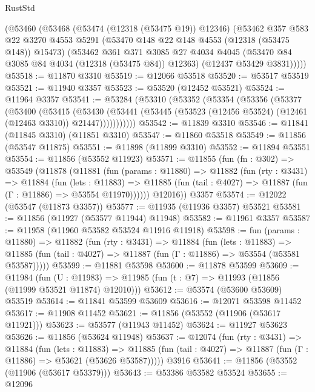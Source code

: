 \begin{lexlean}{RustStd}
\begin{coremodule}
    (@53460
      (@53468
        (@53474 (@12318 (@53475 @19)) @12346)
        (@53462
          @357
          @583
          @22
          @3270
          @4553
          @5291
          (@53470 @148 @22 @148 @4553 (@12318 (@53475 @148)) @15473)
          (@53462
            @361
            @371
            @3085
            @27
            @4034
            @4045
            (@53470 @84 @3085 @84 @4034 (@12318 (@53475 @84)) @12363)
            (@12437 @53429 @3831)))))
@53518 := @11870 @3310
@53519 := @12066 @53518
@53520 := @53517 @53519
@53521 := @11940 @3357
@53523 := @53520 (@12452 @53521)
@53524 := @11964 @3357
@53541 := @53284
    (@53310
      (@53352
        (@53354
          (@53356
            (@53377
              (@53400
                (@53415
                  (@53430
                    (@53441
                      (@53445 (@53523 (@12456 @53524) (@12461 (@12463 @3310)) @21447)))))))))))
@53542 := @11839 @3310
@53546 := @11841 (@11845 @3310) (@11851 @3310)
@53547 := @11860 @53518
@53549 := @11856 (@53547 @11875)
@53551 := @11898 (@11899 @3310)
@53552 := @11894 @53551
@53554 := @11856 (@53552 @11923)
@53571 := @11855
    (fun (fn : @302) =>
    @53549
      (@11878
        (@11881
          (fun (params : @11880) =>
          @11882
            (fun (rty : @3431) =>
            @11884
              (fun (lets : @11883) =>
              @11885 (fun (tail : @4027) => @11887 (fun (Γ : @11886) => @53554 @11970))))))
        @12016))
    @3357
@53574 := @12022 (@53547 (@11873 @3357))
@53577 := @11935 (@11936 @3357) @53521
@53581 := @11856 (@11927 (@53577 @11944) @11948)
@53582 := @11961 @3357
@53587 := @11958 (@11960 @53582 @53524 @11916 @11918)
@53598 := fun (params : @11880) =>
  @11882
    (fun (rty : @3431) =>
    @11884
      (fun (lets : @11883) =>
      @11885 (fun (tail : @4027) => @11887 (fun (Γ : @11886) => @53554 (@53581 @53587)))))
@53599 := @11881 @53598
@53600 := @11878 @53599
@53609 := @11984
    (fun (U : @11983) => @11985 (fun (t : @7) => @11993 (@11856 (@11999 @53521 @11874) @12010)))
@53612 := @53574 (@53600 @53609) @53519
@53614 := @11841 @53599 @53609
@53616 := @12071 @53598 @11452
@53617 := @11908 @11452
@53621 := @11856 (@53552 (@11906 (@53617 @11921)))
@53623 := @53577 (@11943 @11452)
@53624 := @11927 @53623
@53626 := @11856 (@53624 @11948)
@53637 := @12074
    (fun (rty : @3431) =>
    @11884
      (fun (lets : @11883) =>
      @11885 (fun (tail : @4027) => @11887 (fun (Γ : @11886) => @53621 (@53626 @53587)))))
    @3916
@53641 := @11856 (@53552 (@11906 (@53617 @53379)))
@53643 := @53386 @53582 @53524
@53655 := @12096

\end{coremodule}
\end{lexlean}
